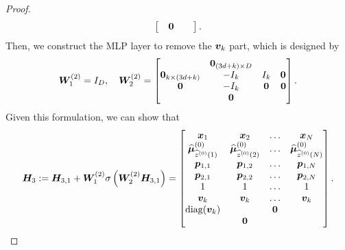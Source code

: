 \begin{proof}
\begin{align*}
\begin{bmatrix}
        &\boldsymbol{0}&&
    \end{bmatrix}.
\end{align*}
Then, we construct the MLP layer to remove the $\boldsymbol{v}_k$ part, which is designed by
\begin{align*}
    \boldsymbol{W}_1^{(2)}=I_D,\quad \boldsymbol{W}_2^{(2)}= \begin{bmatrix}
        &\boldsymbol{0}_{(3d+k)\times D}&&\\
        \boldsymbol{0}_{k\times (3d+k)}&-I_k&I_k&\boldsymbol{0}_{}\\
       \boldsymbol{0} &-I_k&\boldsymbol{0}&\boldsymbol{0}\\
       &\boldsymbol{0}&&
    \end{bmatrix}.
\end{align*}
Given this formulation, we can show that
\begin{align*}
    \boldsymbol{H}_3 := \boldsymbol{H}_{3,1}+\boldsymbol{W}_1^{(2)}\sigma\left(\boldsymbol{W}_2^{(2)}\boldsymbol{H}_{3,1}\right)=\begin{bmatrix}
        \boldsymbol{x}_1&\boldsymbol{x}_2&\ldots&\boldsymbol{x}_N\\
        \widehat{\boldsymbol{\mu}}_{\widehat{z}^{(0)}(1)}^{(0)}&\widehat{\boldsymbol{\mu}}_{\widehat{z}^{(0)}(2)}^{(0)}&\ldots&\widehat{\boldsymbol{\mu}}_{\widehat{z}^{(0)}(N)}^{(0)}\\
        \boldsymbol{p}_{1,1}&\boldsymbol{p}_{1,2}&\ldots&\boldsymbol{p}_{1,N}\\
        \boldsymbol{p}_{2,1}&\boldsymbol{p}_{2,2}&\ldots&\boldsymbol{p}_{2,N}\\
        1&1&\ldots&1\\
        \boldsymbol{v}_k&\boldsymbol{v}_k&\ldots&\boldsymbol{v}_k\\
        \text{diag}(\boldsymbol{v}_k)&&\boldsymbol{0}&\\
        &\boldsymbol{0}&&
    \end{bmatrix}.
\end{align*}


\end{proof}
